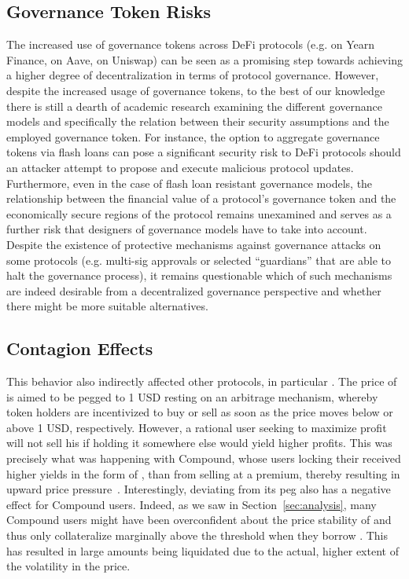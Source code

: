 \subsection{Governance Token Risks}
The increased use of governance tokens across DeFi protocols (e.g.  on Yearn Finance,  on Aave,  on Uniswap) can be seen as a promising step towards achieving a higher degree of decentralization in terms of protocol governance. 
However, despite the increased usage of governance tokens, to the best of our knowledge there is still a dearth of academic research examining the different governance models and specifically the relation between their security assumptions and the employed governance token.
For instance, the option to aggregate governance tokens via flash loans \cite{Wang2020} can pose a significant security risk to DeFi protocols should an attacker attempt to propose and execute malicious protocol updates.
Furthermore, even in the case of flash loan resistant governance models, the relationship between the financial value of a protocol's governance token and the economically secure regions of the protocol remains unexamined and serves as a further risk that designers of governance models have to take into account.
Despite the existence of protective mechanisms against governance attacks on some protocols (e.g. multi-sig approvals or selected ``guardians'' that are able to halt the governance process), it remains questionable which of such mechanisms are indeed desirable from a decentralized governance perspective and whether there might be more suitable alternatives.

\subsection{Contagion Effects}
This behavior also indirectly affected other protocols, in particular .
The price of  is aimed to be pegged to 1 USD resting on an arbitrage mechanism, whereby token holders are incentivized to buy or sell  as soon as the price moves below or above 1 USD, respectively.
However, a rational user seeking to maximize profit will not sell his  if holding it somewhere else would yield higher profits.
This was precisely what was happening with Compound, whose users locking their  received higher yields in the form of , than from selling  at a premium, thereby resulting in upward price pressure~\cite{cyrus2020upcoming}.
Interestingly,  deviating from its peg also has a negative effect for Compound users.
Indeed, as we saw in Section~\ref{sec:analysis}, many Compound users might have been overconfident about the price stability of  and thus only collateralize marginally above the threshold when they borrow .
This has resulted in large amounts being liquidated due to the actual, higher extent of the volatility in the  price.

